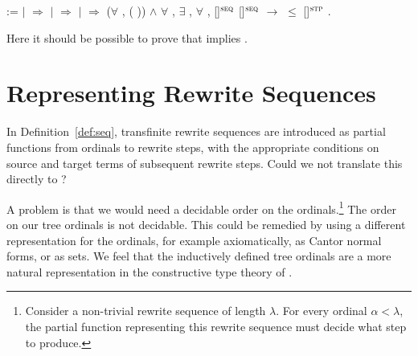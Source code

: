 \begin{singlespace}
\begin{coqdoccode}
:=\coqdoceol
\coqdocindent{1.00em}
 \coqdocvariable{$\varphi$} \coqdoceol
\coqdocindent{1.00em}
\ensuremath{|} 
\coqdocvar{\_}          \ensuremath{\Rightarrow}
\coqdoceol
\coqdocindent{1.00em}
\ensuremath{|} 
\coqdocvar{\_} \coqdocvar{\_} \coqdocvar{$\psi$} \coqdocvar{\_}
\coqdocvar{\_} \ensuremath{\Rightarrow}
\coqdocvariable{$\psi$}\coqdoceol
\coqdocindent{1.00em}
\ensuremath{|} 
\coqdocvar{\_} \coqdocvar{\_}  
\coqdocvar{\_}  \ensuremath{\Rightarrow}
(\ensuremath{\forall} ,
( )) \ensuremath{\land}\coqdoceol
\coqdocindent{2.00em}
\ensuremath{\forall} , \ensuremath{\exists}
\coqdocvar{$\iota$}, \ensuremath{\forall} \coqdocvar{$\kappa$},\coqdoceol
\coqdocindent{3.00em}
\coqdocvariable{$\varphi$}[\coqdocvariable{$\iota$}]$^\textsc{seq}$
\coqdocvariable{$\varphi$}[\coqdocvariable{$\kappa$}]$^\textsc{seq}$
\ensuremath{\rightarrow}
 $\le$
\coqdocvariable{$\varphi$}[\coqdocvariable{$\kappa$}]$^\textsc{stp}$\coqdoceol
\coqdocindent{1.00em}
.\coqdoceol
\end{coqdoccode}
\end{singlespace}
Here it should be possible to prove that
implies
.


\section{Representing Rewrite Sequences}

In Definition~\ref{def:seq}, transfinite rewrite sequences are
introduced as partial functions from ordinals to rewrite steps, with
the appropriate conditions on source and target terms of subsequent
rewrite steps. Could we not translate this directly to \Coq?

A problem is that we would need a decidable order on the
ordinals.\footnote{Consider a non-trivial rewrite sequence of length
  $\lambda$. For every ordinal $\alpha < \lambda$, the partial
  function representing this rewrite sequence must decide what step to
  produce.}
The order on our tree ordinals is not decidable. This could be
remedied by using a different representation for the ordinals, for
example axiomatically, as Cantor normal forms, or as sets. We feel
that the inductively defined tree ordinals are a more natural
representation in the constructive type theory of \Coq.


